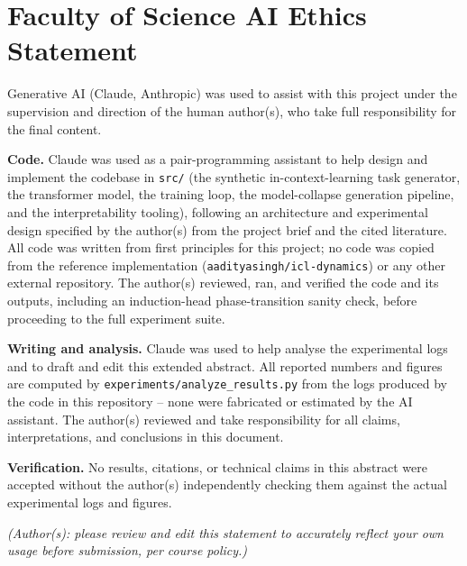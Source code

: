 \documentclass[10pt,letterpaper]{article}
\begin{document}

\setlength{\bibleftmargin}{.125in}
\setlength{\bibindent}{-\bibleftmargin}


\newpage


\newpage
\section*{Faculty of Science AI Ethics Statement}
Generative AI (Claude, Anthropic) was used to assist with this project
under the supervision and direction of the human author(s), who take full
responsibility for the final content.

\textbf{Code.} Claude was used as a pair-programming assistant to help
design and implement the codebase in \texttt{src/} (the synthetic
in-context-learning task generator, the transformer model, the training
loop, the model-collapse generation pipeline, and the interpretability
tooling), following an architecture and experimental design specified by
the author(s) from the project brief and the cited literature. All code
was written from first principles for this project; no code was copied
from the reference implementation (\texttt{aadityasingh/icl-dynamics}) or
any other external repository. The author(s) reviewed, ran, and verified
the code and its outputs, including an induction-head phase-transition
sanity check, before proceeding to the full experiment suite.

\textbf{Writing and analysis.} Claude was used to help analyse the
experimental logs and to draft and edit this extended abstract. All reported
numbers and figures are computed by \texttt{experiments/analyze\_results.py}
from the logs produced by the code in this repository -- none were
fabricated or estimated by the AI assistant. The author(s) reviewed and take
responsibility for all claims, interpretations, and conclusions in this
document.

\textbf{Verification.} No results, citations, or technical claims in this
abstract were accepted without the author(s) independently checking them
against the actual experimental logs and figures.

\textit{(Author(s): please review and edit this statement to accurately
reflect your own usage before submission, per course policy.)}

\clearpage
\setcounter{figure}{0}\setcounter{table}{0}
\renewcommand{\thefigure}{S\arabic{figure}}
\renewcommand{\thetable}{S\arabic{table}}
\end{document}

